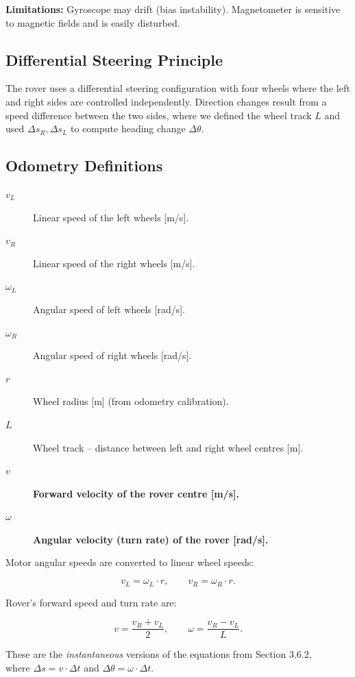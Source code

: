 \textbf{Limitations:}
Gyroscope may drift (bias instability).
Magnetometer is sensitive to magnetic fields and is easily disturbed.

\subsection{Differential Steering Principle}
The rover uses a differential steering configuration with four wheels where the left and right sides are controlled independently.
Direction changes result from a speed difference between the two sides, where we defined the wheel track \(L\) and used \(\Delta s_R, \Delta s_L\) to compute heading change \(\Delta\theta\).

\subsection{Odometry Definitions}

\begin{description}
    \item[\(v_L\)] Linear speed of the left wheels [m/s].
    \item[\(v_R\)] Linear speed of the right wheels [m/s].
    \item[\(\omega_L\)] Angular speed of left wheels [rad/s].
    \item[\(\omega_R\)] Angular speed of right wheels [rad/s].
    \item[\(r\)] Wheel radius [m] (from odometry calibration).
    \item[\(L\)] Wheel track – distance between left and right wheel centres [m].
    \item[\(v\)] \textbf{Forward velocity of the rover centre [m/s].}
    \item[\(\omega\)] \textbf{Angular velocity (turn rate) of the rover [rad/s].}
\end{description}

Motor angular speeds are converted to linear wheel speeds:

\begin{equation}
v_L = \omega_L \cdot r, \qquad v_R = \omega_R \cdot r.
\end{equation}

Rover’s forward speed and turn rate are:

\begin{equation}
v = \frac{v_R + v_L}{2}, \qquad
\omega = \frac{v_R - v_L}{L}.
\end{equation}

These are the \textit{instantaneous} versions of the equations from Section 3.6.2, \\ 
   where \(\Delta s = v \cdot \Delta t\) and \(\Delta\theta = \omega \cdot \Delta t\).

